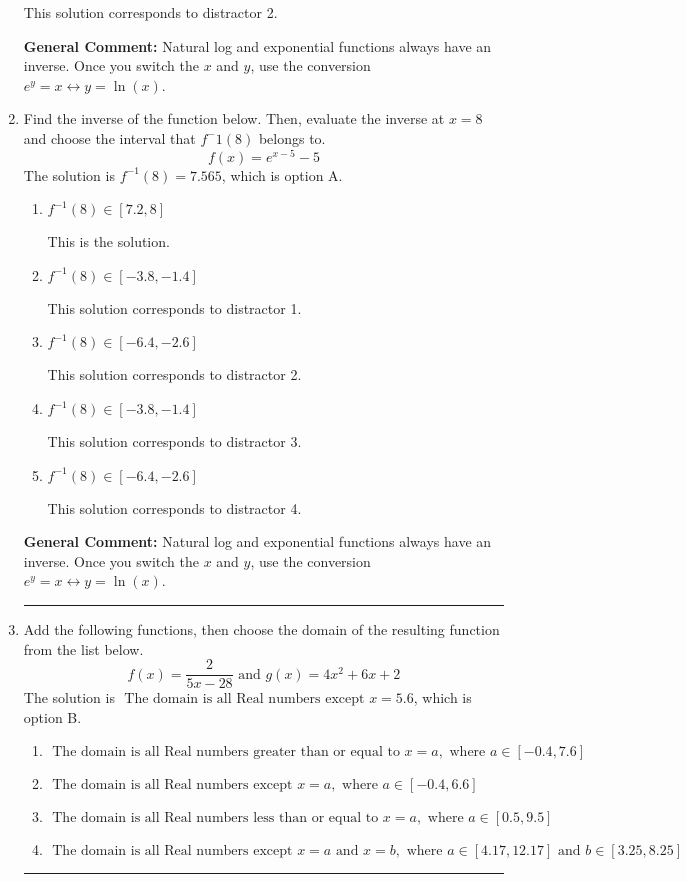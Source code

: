 \documentclass{extbook}[14pt]
\newcommand{\litem}[1]{\item #1

\rule{\textwidth}{0.4pt}}
\begin{document}
\begin{enumerate}
{\begin{enumerate}[label=\Alph*.]
 This solution corresponds to distractor 2.
\end{enumerate}

\textbf{General Comment:} Natural log and exponential functions always have an inverse. Once you switch the $x$ and $y$, use the conversion $ e^y = x \leftrightarrow y=\ln(x)$.
}
\litem{
Find the inverse of the function below. Then, evaluate the inverse at $x = 8$ and choose the interval that $f^-1(8)$ belongs to.
\[ f(x) = e^{x-5}-5 \]The solution is \( f^{-1}(8) = 7.565 \), which is option A.\begin{enumerate}[label=\Alph*.]
\item \( f^{-1}(8) \in [7.2, 8] \)

 This is the solution.
\item \( f^{-1}(8) \in [-3.8, -1.4] \)

 This solution corresponds to distractor 1.
\item \( f^{-1}(8) \in [-6.4, -2.6] \)

 This solution corresponds to distractor 2.
\item \( f^{-1}(8) \in [-3.8, -1.4] \)

 This solution corresponds to distractor 3.
\item \( f^{-1}(8) \in [-6.4, -2.6] \)

 This solution corresponds to distractor 4.
\end{enumerate}

\textbf{General Comment:} Natural log and exponential functions always have an inverse. Once you switch the $x$ and $y$, use the conversion $ e^y = x \leftrightarrow y=\ln(x)$.
}
\litem{
Add the following functions, then choose the domain of the resulting function from the list below.
\[ f(x) = \frac{2}{5x-28} \text{ and } g(x) = 4x^{2} +6 x + 2 \]The solution is \( \text{ The domain is all Real numbers except } x = 5.6 \), which is option B.\begin{enumerate}[label=\Alph*.]
\item \( \text{ The domain is all Real numbers greater than or equal to } x = a, \text{ where } a \in [-0.4, 7.6] \)


\item \( \text{ The domain is all Real numbers except } x = a, \text{ where } a \in [-0.4, 6.6] \)


\item \( \text{ The domain is all Real numbers less than or equal to } x = a, \text{ where } a \in [0.5, 9.5] \)


\item \( \text{ The domain is all Real numbers except } x = a \text{ and } x = b, \text{ where } a \in [4.17, 12.17] \text{ and } b \in [3.25, 8.25] \)



\end{enumerate}}
\end{enumerate}
\end{document}
